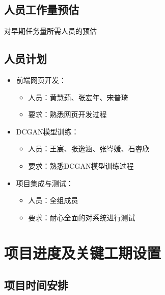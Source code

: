 \documentclass[
  hyperref, a4paper]{ctexart}
\providecommand{\tightlist}{%
  \setlength{\itemsep}{0pt}\setlength{\parskip}{0pt}}
\begin{document}
\hypertarget{ux4ebaux5458ux5de5ux4f5cux91cfux9884ux4f30}{%
\subsection{人员工作量预估}\label{ux4ebaux5458ux5de5ux4f5cux91cfux9884ux4f30}}

对早期任务量所需人员的预估

\hypertarget{ux4ebaux5458ux8ba1ux5212}{%
\subsection{人员计划}\label{ux4ebaux5458ux8ba1ux5212}}

\begin{itemize}
\tightlist
\item
  前端网页开发：

  \begin{itemize}
  \tightlist
  \item
    人员：黄慧茹、张宏年、宋普琦
  \item
    要求：熟悉网页开发过程
  \end{itemize}
\item
  DCGAN模型训练：

  \begin{itemize}
  \tightlist
  \item
    人员：王宸、张逸涵、张岑媛、石睿欣
  \item
    要求：熟悉DCGAN模型训练过程
  \end{itemize}
\item
  项目集成与测试：

  \begin{itemize}
  \tightlist
  \item
    人员：全组成员
  \item
    要求：耐心全面的对系统进行测试
  \end{itemize}
\end{itemize}

\hypertarget{ux9879ux76eeux8fdbux5ea6ux53caux5173ux952eux5de5ux671fux8bbeux7f6e}{%
\section{项目进度及关键工期设置}\label{ux9879ux76eeux8fdbux5ea6ux53caux5173ux952eux5de5ux671fux8bbeux7f6e}}

\hypertarget{ux9879ux76eeux65f6ux95f4ux5b89ux6392}{%
\subsection{项目时间安排}\label{ux9879ux76eeux65f6ux95f4ux5b89ux6392}}
\end{document}
